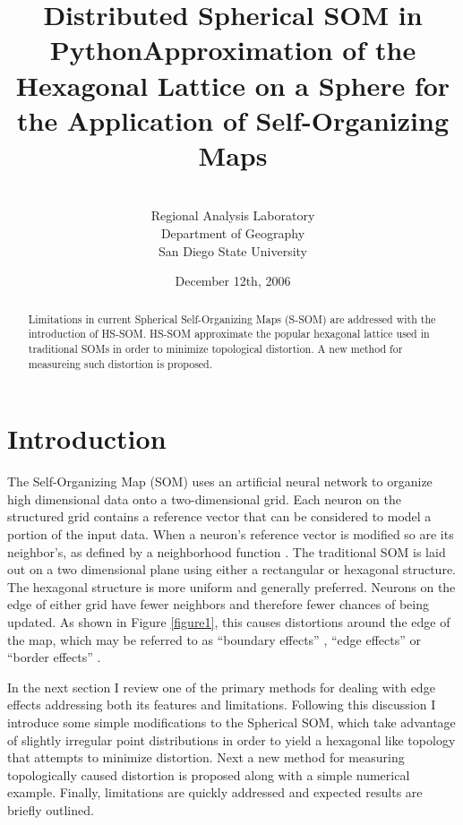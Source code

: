 \documentclass[12pt]{article}
\title{Distributed Spherical SOM in Python}
\title{Approximation of the Hexagonal Lattice on a Sphere for the Application
of Self-Organizing Maps}
\author{\sc{Charles R. Schmidt}\\Regional Analysis Laboratory\\Department of Geography\\San Diego State University}
\date{December 12th, 2006}
\begin{document}
\maketitle
\begin{abstract}
Limitations in current Spherical Self-Organizing Maps (S-SOM) are addressed with the
introduction of HS-SOM.  HS-SOM approximate the popular hexagonal
lattice used in traditional SOMs in order to minimize topological distortion.
A new method for measureing such distortion is proposed.
\end{abstract}
\section{Introduction}
The Self-Organizing Map (SOM) uses an artificial neural network to organize high
dimensional data onto a two-dimensional grid.  Each neuron on the structured
grid contains a reference vector that can be considered to model a portion of
the input data. When a neuron's reference vector is modified so are its
neighbor's, as defined by a neighborhood function \citep{Kohonen2000}.  The
traditional SOM is laid out on a two dimensional plane using either a
rectangular or hexagonal structure.  The hexagonal structure is more uniform
and generally preferred.  Neurons on the edge of either grid have fewer
neighbors and therefore fewer chances of being updated\citep{Wu:2006lr}.  As
shown in Figure \ref{figure1}, this causes distortions around the edge of the
map, which may be referred to as ``boundary effects'' \citep{ritter99}, ``edge
effects'' \citep{boudjemai2003} or  ``border effects'' \citep{Wu:2006lr}.

In the next section I review one of the primary methods for dealing with edge
effects addressing both its features and limitations.  Following this
discussion I introduce some simple modifications to the Spherical SOM, which
take advantage of slightly irregular point distributions in order to yield a
hexagonal like topology that attempts to minimize distortion.  Next a new
method for measuring topologically caused distortion is proposed along with a
simple numerical example.  Finally, limitations are quickly addressed and
expected results are briefly outlined.
\end{document}

